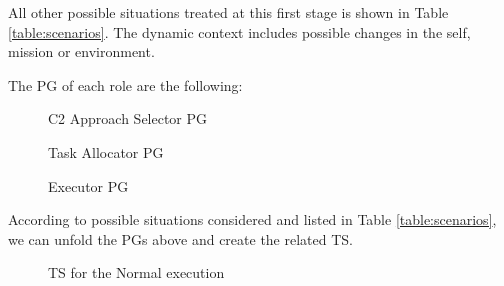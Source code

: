 All other possible situations treated at this first stage is shown in Table \ref{table:scenarios}. The dynamic context includes possible changes in the self, mission or environment.



The PG of each role are the following:

\begin{figure}[h!]
\centering
\label{PG001}
\scalebox{.8}{}
\caption{C2 Approach Selector PG}
\end{figure}


\begin{figure}[h!]
\centering
\label{PG002}
\scalebox{.8}{}
\caption{Task Allocator PG}
\end{figure}


\begin{figure}[h!]
\centering
\label{PG003}
\scalebox{.8}{}
\caption{Executor PG}
\end{figure}

According to possible situations considered and listed in Table \ref{table:scenarios}, we can unfold the PGs above and create the related TS.

\begin{figure}[h!]
\centering
\label{TS01}
\scalebox{.8}{}
\caption{TS for the Normal execution}
\end{figure}





